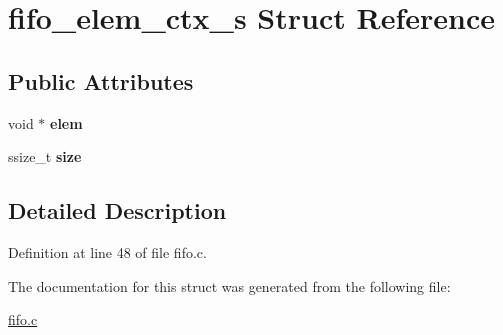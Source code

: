 \hypertarget{structfifo__elem__ctx__s}{}\section{fifo\+\_\+elem\+\_\+ctx\+\_\+s Struct Reference}
\label{structfifo__elem__ctx__s}
\subsection*{Public Attributes}
\begin{DoxyCompactItemize}
\item 
void $\ast$ {\bfseries elem}\hypertarget{structfifo__elem__ctx__s_ae5add7272abafb06c8bc1a810c4b7719}{}\label{structfifo__elem__ctx__s_ae5add7272abafb06c8bc1a810c4b7719}

\item 
ssize\+\_\+t {\bfseries size}\hypertarget{structfifo__elem__ctx__s_af24ec8cd7ee7365d825ed9148ff2e50a}{}\label{structfifo__elem__ctx__s_af24ec8cd7ee7365d825ed9148ff2e50a}

\end{DoxyCompactItemize}


\subsection{Detailed Description}


Definition at line 48 of file fifo.\+c.



The documentation for this struct was generated from the following file\+:\begin{DoxyCompactItemize}
\item 
\hyperlink{fifo_8c}{fifo.\+c}\end{DoxyCompactItemize}
